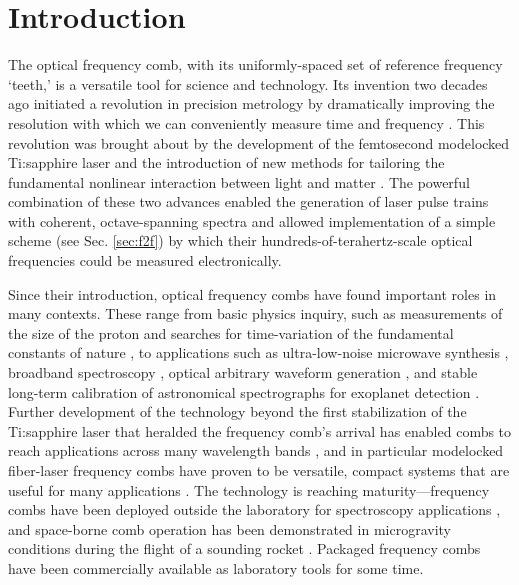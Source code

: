  \chapter{Introduction}
\label{chap:introduction}

The optical frequency comb, with its uniformly-spaced set of reference frequency `teeth,' is a versatile tool for science and technology. Its invention two decades ago initiated a revolution in precision metrology by dramatically improving the resolution with which we can conveniently measure time and frequency \cite{Diddams2000,Jones2000,Diddams2001,Udem2002,Hall2006,Hansch2006}. This revolution was brought about by the development of the femtosecond modelocked Ti:sapphire laser \cite{Stingl1995} and the introduction of new methods for tailoring the fundamental nonlinear interaction between light and matter \cite{Ranka2000,Dudley2006}. The powerful combination of these two advances enabled the generation of laser pulse trains with coherent, octave-spanning spectra and allowed implementation of a simple scheme (see Sec. \ref{sec:f2f}) by which their hundreds-of-terahertz-scale optical frequencies could be measured electronically.

Since their introduction, optical frequency combs have found important roles in many contexts. These range from basic physics inquiry, such as measurements of the size of the proton \cite{Beyer2017} and searches for time-variation of the fundamental constants of nature \cite{Lea2007,Blatt2008}, to applications such as ultra-low-noise microwave synthesis \cite{McFerran2005,Fortier2011}, broadband spectroscopy \cite{Diddams2007,Coddington2016}, optical arbitrary waveform generation \cite{Cundiff2010}, and stable long-term calibration of astronomical spectrographs for exoplanet detection \cite{Steinmetz2008}. Further development of the technology beyond the first stabilization of the Ti:sapphire laser that heralded the frequency comb's arrival has enabled combs to reach applications across many wavelength bands \cite{Washburn2004a,Gohle2005b,Diddams2010,Faist2016}, and in particular modelocked fiber-laser frequency combs have proven to be versatile, compact systems that are useful for many applications \cite{Newbury2007,Fermann2013,Sinclair2015}. The technology is reaching maturity---frequency combs have been deployed outside the laboratory for spectroscopy applications \cite{Sinclair2014,Coburn2018}, and space-borne comb operation has been demonstrated in microgravity conditions during the flight of a sounding rocket \cite{Lezius2016}. Packaged frequency combs have been commercially available as laboratory tools for some time.

